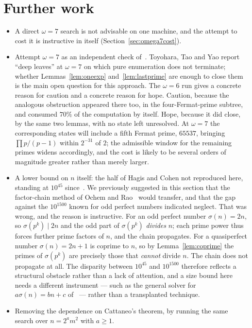 \documentclass[11pt]{amsart}
\theoremstyle{remark}
\begin{document}
\section{Further work}\label{sec:further}

\begin{itemize}
\item A direct $\omega = 7$ search is not advisable on one machine, and the
  attempt to cost it is instructive in itself
  (Section~\ref{sec:omega7cost}).
\item Attempt $\omega = 7$ as an independent check of~\cite{tty}. Toyohara, Tao
  and Yao report ``deep leaves'' at $\omega = 7$ on which pure enumeration does
  not terminate; whether Lemmas~\ref{lem:oneexp} and~\ref{lem:lastprime} are
  enough to close them is the main open question for this approach. The
  $\omega = 6$ run gives a concrete reason for caution and a concrete reason for
  hope. Caution, because the analogous obstruction appeared there too, in the
  four-Fermat-prime subtree, and consumed $70\%$ of the computation by itself.
  Hope, because it did close, by the same two lemmas, with no state left
  unresolved. At $\omega = 7$ the corresponding states will include a fifth
  Fermat prime, $65537$, bringing $\prod p/(p-1)$ within $2^{-31}$ of $2$; the
  admissible window for the remaining primes widens accordingly, and the cost
  is likely to be several orders of magnitude greater rather than merely larger.
\item A lower bound on $n$ itself: the half of Hagis and Cohen not reproduced
  here, standing at $10^{45}$ since~\cite{alekseyev}. We previously suggested in
  this section that the factor-chain method of Ochem and Rao~\cite{ochemrao}
  would transfer, and that the gap against the $10^{1500}$ known for odd perfect
  numbers indicated neglect. That was wrong, and the reason is instructive. For
  an odd perfect number $\sigma(n) = 2n$, so $\sigma(p^{k}) \mid 2n$ and the odd
  part of $\sigma(p^{k})$ \emph{divides} $n$; each prime power thus forces
  further prime factors of $n$, and the chain propagates. For a quasiperfect
  number $\sigma(n) = 2n+1$ is coprime to $n$, so by Lemma~\ref{lem:coprime} the
  primes of $\sigma(p^{k})$ are precisely those that \emph{cannot} divide $n$.
  The chain does not propagate at all. The disparity between $10^{45}$ and
  $10^{1500}$ therefore reflects a structural obstacle rather than a lack of
  attention, and a size bound here needs a different instrument --- such as the
  general solver for $a\sigma(n) = bn + c$ of~\cite{alekseyev} --- rather than a
  transplanted technique.
\item Removing the dependence on Cattaneo's theorem, by running the same search
  over $n = 2^{a}m^{2}$ with $a \ge 1$.
\end{itemize}
\end{document}
